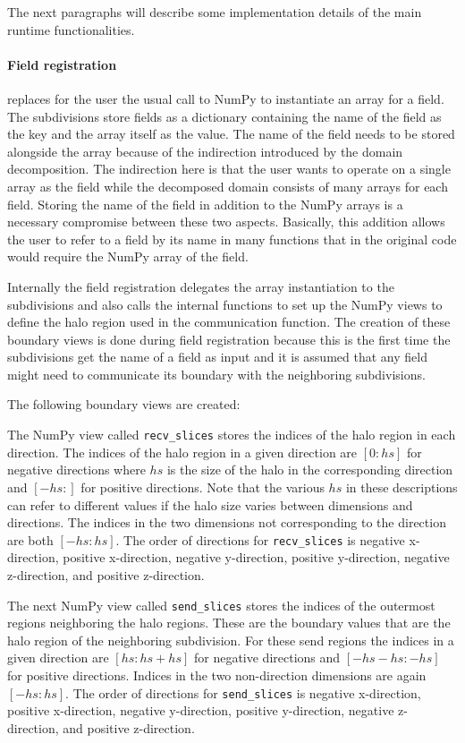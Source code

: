The next paragraphs will describe some implementation details of the main runtime functionalities.

\paragraph{Field registration } replaces for the user the usual call to NumPy to instantiate an array for a field.
The subdivisions store fields as a dictionary containing the name of the field as the key and the array itself as the value.
The name of the field needs to be stored alongside the array because of the indirection introduced by the domain decomposition.
The indirection here is that the user wants to operate on a single array as the field while the decomposed domain consists of many arrays for each field.
Storing the name of the field in addition to the NumPy arrays is a necessary compromise between these two aspects.
Basically, this addition allows the user to refer to a field by its name in many functions that in the original code would require the NumPy array of the field.

Internally the field registration delegates the array instantiation to the subdivisions and also calls the internal functions to set up the NumPy views to define the halo region used in the communication function.
The creation of these boundary views is done during field registration because this is the first time the subdivisions get the name of a field as input and it is assumed that any field might need to communicate its boundary with the neighboring subdivisions.

The following boundary views are created:

The NumPy view called \texttt{recv\_slices} stores the indices of the halo region in each direction.
The indices of the halo region in a given direction are $\left[0:hs\right]$ for negative directions where $hs$ is the size of the halo in the corresponding direction and $\left[-hs:\right]$ for positive directions.
Note that the various $hs$ in these descriptions can refer to different values if the halo size varies between dimensions and directions.
The indices in the two dimensions not corresponding to the direction are both $\left[-hs:hs\right]$.
The order of directions for \texttt{recv\_slices} is negative x-direction, positive x-direction, negative y-direction, positive y-direction, negative z-direction, and positive z-direction.

The next NumPy view called \texttt{send\_slices} stores the indices of the outermost regions neighboring the halo regions.
These are the boundary values that are the halo region of the neighboring subdivision.
For these send regions the indices in a given direction are $\left[hs:hs+hs\right]$ for negative directions and $\left[-hs -hs:-hs\right]$ for positive directions.
Indices in the two non-direction dimensions are again $\left[-hs:hs\right]$.
The order of directions for \texttt{send\_slices} is negative x-direction, positive x-direction, negative y-direction, positive y-direction, negative z-direction, and positive z-direction.

